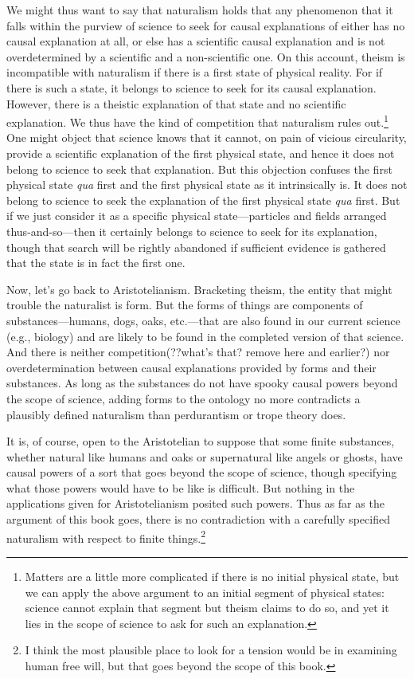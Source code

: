 We might thus want to say that naturalism holds that any phenomenon that it falls within the purview of science 
to seek for causal explanations of either has no causal explanation at all, or else has a scientific causal explanation 
and is not overdetermined by a scientific and a non-scientific one. On this account, theism is incompatible with
naturalism if there is a first state of physical reality. For if there is such a state, it belongs
to science to seek for its causal explanation. However, there is a theistic explanation of that state and no 
scientific explanation. We thus have the kind of competition that naturalism rules out.\footnote{Matters are a little more
complicated if there is no initial physical state, but we can apply the above argument to an initial
segment of physical states: science cannot explain that segment but theism claims to do so, and yet it lies
in the scope of science to ask for such an explanation.} One might object that science knows that it cannot, on pain
of vicious circularity, provide a scientific explanation of the first physical state, and hence it does not belong to
science to seek that explanation. But this objection confuses the first physical state \textit{qua} first and the
first physical state as it intrinsically is. It does not belong to science to seek the explanation of the first physical
state \textit{qua} first. But if we just consider it as a specific physical state---particles and fields arranged thus-and-so---then
it certainly belongs to science to seek for its explanation, though that search will be rightly abandoned if sufficient evidence
is gathered that the state is in fact the first one.

Now, let's go back to Aristotelianism. Bracketing theism, the entity that might trouble the naturalist is form.
But the forms of things are components of substances---humans, dogs, oaks, etc.---that are also found in our current
science (e.g., biology) and are likely to be found in the completed version of that science. And there is neither
competition(??what's that? remove here and earlier?) nor overdetermination between causal explanations provided by
forms and their substances. As long as the substances do not have spooky causal powers beyond the scope of science,
adding forms to the ontology no more contradicts a plausibly defined naturalism than perdurantism or trope theory
does.

It is, of course, open to the Aristotelian to suppose that some finite substances, whether natural like humans and oaks 
or  supernatural like angels or ghosts, have causal powers of a sort that goes beyond the scope of science, though
specifying what those powers would have to be like is difficult. But nothing in the applications given for Aristotelianism
posited such powers. Thus as far as the argument of this book goes, there is no contradiction with a carefully
specified naturalism with respect to finite things.\footnote{I think the most plausible place to look for a tension 
would be in examining human free will, but that goes beyond the scope of this book.}

